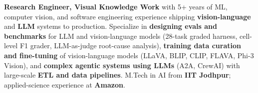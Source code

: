 \documentclass[letter,10pt]{article}
\begin{document}

\textbf{Research Engineer, Visual Knowledge Work} with 5+ years of ML, computer vision, and software engineering experience shipping \textbf{vision-language} and \textbf{LLM} systems to production.
Specialize in \textbf{designing evals and benchmarks} for LLM and vision-language models (28-task graded harness, cell-level F1 grader, LLM-as-judge root-cause analysis), \textbf{training data curation and fine-tuning} of vision-language models (LLaVA, BLIP, CLIP, FLAVA, Phi-3 Vision), and \textbf{complex agentic systems using LLMs} (A2A, CrewAI) with large-scale \textbf{ETL and data pipelines}.
M.Tech in AI from \textbf{IIT Jodhpur}; applied-science experience at \textbf{Amazon}.
\end{document}
